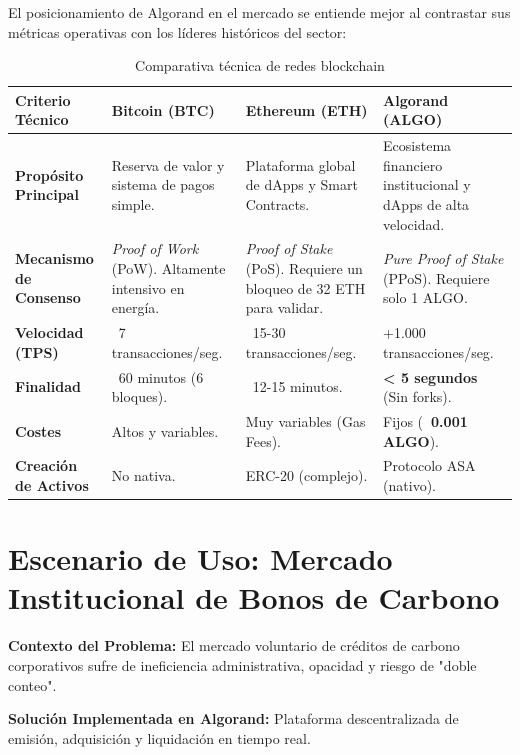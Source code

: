 \documentclass[12pt]{article}
\begin{document}
El posicionamiento de Algorand en el mercado se entiende mejor al contrastar sus métricas operativas con los líderes históricos del sector:

\begingroup
\centering
\begin{longtable}{lp{3cm}p{3cm}p{3cm}}
\caption{Comparativa técnica de redes blockchain} \\
\toprule
\textbf{Criterio Técnico} & \textbf{Bitcoin (BTC)} & \textbf{Ethereum (ETH)} & \textbf{Algorand (ALGO)} \\
\midrule
\endhead
\textbf{Propósito Principal} & Reserva de valor y sistema de pagos simple. & Plataforma global de dApps y Smart Contracts. & Ecosistema financiero institucional y dApps de alta velocidad. \\
\midrule
\textbf{Mecanismo de Consenso} & \textit{Proof of Work} (PoW). Altamente intensivo en energía. & \textit{Proof of Stake} (PoS). Requiere un bloqueo de 32 ETH para validar. & \textit{Pure Proof of Stake} (PPoS). Requiere solo 1 ALGO. \\
\midrule
\textbf{Velocidad (TPS)} & ~7 transacciones/seg. & ~15-30 transacciones/seg. & +1.000 transacciones/seg. \\
\midrule
\textbf{Finalidad} & ~60 minutos (6 bloques). & ~12-15 minutos. & \textbf{< 5 segundos} (Sin forks). \\
\midrule
\textbf{Costes} & Altos y variables. & Muy variables (Gas Fees). & Fijos (\textbf{~0.001 ALGO}). \\
\midrule
\textbf{Creación de Activos} & No nativa. & ERC-20 (complejo). & Protocolo ASA (nativo). \\
\bottomrule
\end{longtable}
\endgroup

\section{Escenario de Uso: Mercado Institucional de Bonos de Carbono}

\textbf{Contexto del Problema:} El mercado voluntario de créditos de carbono corporativos sufre de ineficiencia administrativa, opacidad y riesgo de "doble conteo".

\textbf{Solución Implementada en Algorand:} Plataforma descentralizada de emisión, adquisición y liquidación en tiempo real.
\end{document}

